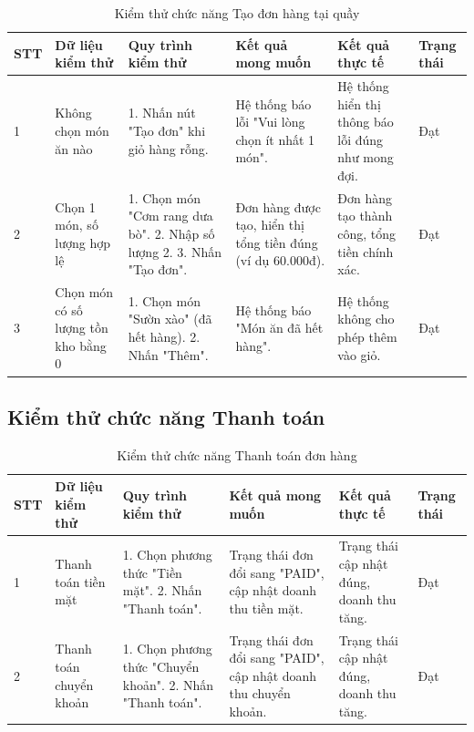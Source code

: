\documentclass[../20232006p.tex]{subfiles}
\begin{document}
\begin{table}[H]
    \centering
    \caption{Kiểm thử chức năng Tạo đơn hàng tại quầy}
    \label{tab:test_create_order}
    \begin{tabular}{|p{0.5cm}|p{3.5cm}|p{4cm}|p{2.5cm}|p{2cm}|p{1.5cm}|}
        \hline
        \textbf{STT} & \textbf{Dữ liệu kiểm thử}           & \textbf{Quy trình kiểm thử}                                           & \textbf{Kết quả mong muốn}                                  & \textbf{Kết quả thực tế}                           & \textbf{Trạng thái} \\
        \hline
        1            & Không chọn món ăn nào               & 1. Nhấn nút "Tạo đơn" khi giỏ hàng rỗng.                              & Hệ thống báo lỗi "Vui lòng chọn ít nhất 1 món".             & Hệ thống hiển thị thông báo lỗi đúng như mong đợi. & Đạt                 \\
        \hline
        2            & Chọn 1 món, số lượng hợp lệ         & 1. Chọn món "Cơm rang dưa bò". 2. Nhập số lượng 2. 3. Nhấn "Tạo đơn". & Đơn hàng được tạo, hiển thị tổng tiền đúng (ví dụ 60.000đ). & Đơn hàng tạo thành công, tổng tiền chính xác.      & Đạt                 \\
        \hline
        3            & Chọn món có số lượng tồn kho bằng 0 & 1. Chọn món "Sườn xào" (đã hết hàng). 2. Nhấn "Thêm".                 & Hệ thống báo "Món ăn đã hết hàng".                          & Hệ thống không cho phép thêm vào giỏ.              & Đạt                 \\
        \hline
    \end{tabular}
\end{table}

\subsection{Kiểm thử chức năng Thanh toán}

\begin{table}[H]
    \centering
    \caption{Kiểm thử chức năng Thanh toán đơn hàng}
    \label{tab:test_payment}
    \begin{tabular}{|p{0.5cm}|p{3.5cm}|p{4cm}|p{2.5cm}|p{2cm}|p{1.5cm}|}
        \hline
        \textbf{STT} & \textbf{Dữ liệu kiểm thử} & \textbf{Quy trình kiểm thử}                               & \textbf{Kết quả mong muốn}                                       & \textbf{Kết quả thực tế}                  & \textbf{Trạng thái} \\
        \hline
        1            & Thanh toán tiền mặt       & 1. Chọn phương thức "Tiền mặt". 2. Nhấn "Thanh toán".     & Trạng thái đơn đổi sang "PAID", cập nhật doanh thu tiền mặt.     & Trạng thái cập nhật đúng, doanh thu tăng. & Đạt                 \\
        \hline
        2            & Thanh toán chuyển khoản   & 1. Chọn phương thức "Chuyển khoản". 2. Nhấn "Thanh toán". & Trạng thái đơn đổi sang "PAID", cập nhật doanh thu chuyển khoản. & Trạng thái cập nhật đúng, doanh thu tăng. & Đạt                 \\
        \hline
    \end{tabular}
\end{table}
\end{document}
